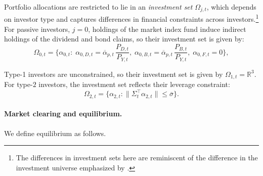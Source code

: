 \documentclass[12pt,english]{article}
\begin{document}
Portfolio allocations are restricted to lie in an \textit{investment set} $\Omega_{j,t}$, which depends on investor type and captures differences in financial constraints across investors.\footnote{
    The differences in investment sets here are reminiscent of the difference in the investment universe emphasized by \citet{Koijen/Yogo/19}.
    }
For passive investors, $j=0$, holdings of the market index fund induce indirect holdings of the dividend and bond claims, so their investment set is given by:
\begin{equation}
    \Omega_{0,t} = \bigg\{\alpha_{0,t}:\;
\alpha_{0,D,t} = \overline{\alpha}_{p,t}\, \frac{P_{D,t}}{P_{Y,t}},
\; \alpha_{0,B,t} = \overline{\alpha}_{p,t}\, \frac{P_{B,t}}{P_{Y,t}},
\; \alpha_{0,F,t} = 0\bigg\},
\end{equation}

Type-1 investors are unconstrained, so their investment set is given by $\Omega_{1,t} = \mathbb{R}^3$.
For type-$2$ investors, the investment set reflects their leverage constraint:
\begin{equation}
\Omega_{2,t} = \big\{\alpha_{2,t}: \|\Sigma_t^\top \alpha_{2,t}\| \leq \overline{\sigma}\big\}.
\end{equation}


\paragraph{Market clearing and equilibrium.}

We define equilibrium as follows.
\end{document}
